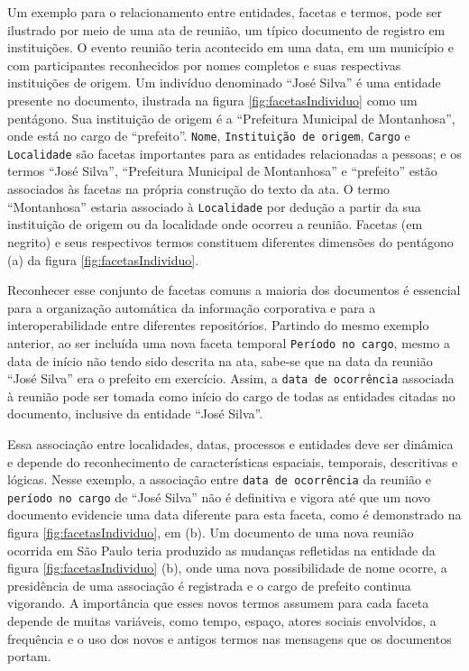 Um exemplo para o relacionamento entre entidades, facetas e termos, pode ser ilustrado por meio de uma ata de reunião, um típico documento de registro em instituições. O evento reunião teria acontecido em uma data, em um município e com participantes reconhecidos por nomes completos e suas respectivas instituições de origem. Um indivíduo denominado ``José Silva'' é uma entidade presente no documento, ilustrada na figura \ref{fig:facetasIndividuo} como um pentágono. Sua instituição de origem é a ``Prefeitura Municipal de Montanhosa'', onde está no cargo de ``prefeito''. \texttt{Nome}, \texttt{Instituição de origem}, \texttt{Cargo} e \texttt{Localidade} são facetas importantes para as entidades relacionadas a pessoas; e os termos ``José Silva'', ``Prefeitura Municipal de Montanhosa'' e ``prefeito'' estão associados às facetas na própria construção do texto da ata. O termo ``Montanhosa'' estaria associado à \texttt{Localidade} por dedução a partir da sua instituição de origem ou da localidade onde ocorreu a reunião. Facetas (em negrito) e seus respectivos termos constituem diferentes dimensões do pentágono (a) da figura \ref{fig:facetasIndividuo}.

Reconhecer esse conjunto de facetas comuns a maioria dos documentos é essencial para a organização automática da informação corporativa e para a interoperabilidade entre diferentes repositórios. Partindo do mesmo exemplo anterior, ao ser incluída uma nova faceta temporal \texttt{Período no cargo}, mesmo a data de início não tendo sido descrita na ata, sabe-se que na data da reunião ``José Silva'' era o prefeito em exercício. Assim, a \texttt{data de ocorrência} associada à reunião pode ser tomada como início do cargo de todas as entidades citadas no documento, inclusive da entidade ``José Silva''.

Essa associação entre localidades, datas, processos e entidades deve ser dinâmica e depende do reconhecimento de características espaciais, temporais, descritivas e lógicas. Nesse exemplo, a associação entre \texttt{data de ocorrência} da reunião e \texttt{período no cargo} de ``José Silva'' não é definitiva e vigora até que um novo documento evidencie uma data diferente para esta faceta, como é demonstrado na figura \ref{fig:facetasIndividuo}, em (b). Um documento de uma nova reunião ocorrida em São Paulo teria produzido as mudanças refletidas na entidade da figura \ref{fig:facetasIndividuo} (b), onde uma nova possibilidade de nome ocorre, a presidência de uma associação é registrada e o cargo de prefeito continua vigorando. A importância que esses novos termos assumem para cada faceta depende de muitas variáveis, como tempo, espaço, atores sociais envolvidos, a frequência e o uso dos novos e antigos termos nas mensagens que os documentos portam.

